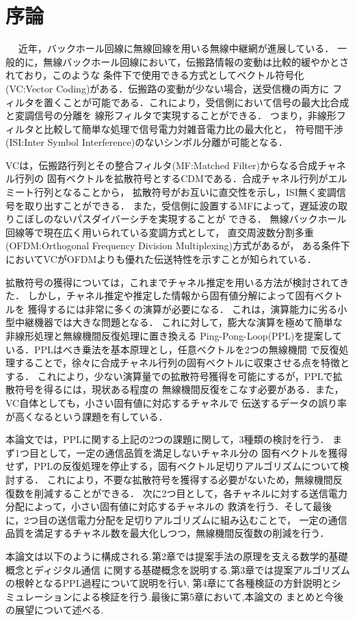 \chapter{序論}
　
近年，バックホール回線に無線回線を用いる無線中継網が進展している．\cite{yamo} \cite{pabst}
一般的に，無線バックホール回線において，伝搬路情報の変動は比較的緩やかとされており，このような
条件下で使用できる方式としてベクトル符号化(VC:Vector Coding)がある．伝搬路の変動が少ない場合，送受信機の両方に
フィルタを置くことが可能である．これにより，受信側において信号の最大比合成と変調信号の分離を
線形フィルタで実現することができる．
つまり，非線形フィルタと比較して簡単な処理で信号電力対雑音電力比の最大化と，
符号間干渉(ISI:Inter Symbol Interference)のないシンボル分離が可能となる．

VCは，伝搬路行列とその整合フィルタ(MF:Matched Filter)からなる合成チャネル行列の
固有ベクトルを拡散符号とするCDMである．合成チャネル行列がエルミート行列となることから，
拡散符号がお互いに直交性を示し，ISI無く変調信号を取り出すことができる．
また，受信側に設置するMFによって，遅延波の取りこぼしのないパスダイバーシチを実現することが
できる．\cite{furukawa} 無線バックホール回線等で現在広く用いられている変調方式として，
直交周波数分割多重(OFDM:Orthogonal Frequency Division Multiplexing)方式があるが，
ある条件下においてVCがOFDMよりも優れた伝送特性を示すことが知られている．
\cite{kasturia}\cite{furukawa,li,takeda,takanashi}

拡散符号の獲得については，これまでチャネル推定を用いる方法が検討されてきた．\cite{nagate} 
\cite{imamura} しかし，チャネル推定や推定した情報から固有値分解によって固有ベクトルを
獲得するには非常に多くの演算が必要になる．\cite{takano} \cite{takeda2}
これは，演算能力に劣る小型中継機器では大きな問題となる．
これに対して，膨大な演算を極めて簡単な非線形処理と無線機間反復処理に置き換える
Ping-Pong-Loop(PPL)を提案している．PPLはべき乗法を基本原理とし，任意ベクトルを2つの無線機間
で反復処理することで，徐々に合成チャネル行列の固有ベクトルに収束させる点を特徴とする．
これにより，少ない演算量での拡散符号獲得を可能にするが，PPLで拡散符号を得るには，現状ある程度の
無線機間反復をこなす必要がある．また，VC自体としても，小さい固有値に対応するチャネルで
伝送するデータの誤り率が高くなるという課題を有している．

本論文では，PPLに関する上記の2つの課題に関して，3種類の検討を行う．
まず1つ目として，一定の通信品質を満足しないチャネル分の
固有ベクトルを獲得せず，PPLの反復処理を停止する，固有ベクトル足切りアルゴリズムについて検討する．
これにより，不要な拡散符号を獲得する必要がないため，無線機間反復数を削減することができる．
次に2つ目として，各チャネルに対する送信電力分配によって，小さい固有値に対応するチャネルの
救済を行う．そして最後に，2つ目の送信電力分配を足切りアルゴリズムに組み込むことで，
一定の通信品質を満足するチャネル数を最大化しつつ，無線機間反復数の削減を行う．

本論文は以下のように構成される.第2章では提案手法の原理を支える数学的基礎概念とディジタル通信
に関する基礎概念を説明する.第3章では提案アルゴリズムの根幹となるPPL過程について説明を行い,
第4章にて各種検証の方針説明とシミュレーションによる検証を行う.最後に第5章において,本論文の
まとめと今後の展望について述べる.